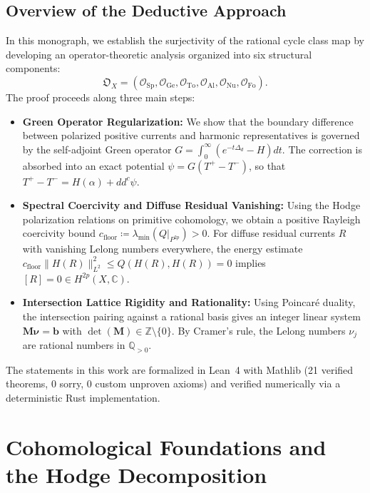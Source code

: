 \documentclass[11pt,a4paper]{article}
\theoremstyle{definition}
\theoremstyle{plain}
\begin{document}
\subsection*{Overview of the Deductive Approach}
In this monograph, we establish the surjectivity of the rational cycle class map by developing an operator-theoretic analysis organized into six structural components:
\begin{equation}
    \label{eq:master_object}
    \mathfrak{O}_X = \left( \mathcal{O}_{\mathrm{Sp}}, \mathcal{O}_{\mathrm{Ge}}, \mathcal{O}_{\mathrm{To}}, \mathcal{O}_{\mathrm{Al}}, \mathcal{O}_{\mathrm{Nu}}, \mathcal{O}_{\mathrm{Fo}} \right).
\end{equation}
The proof proceeds along three main steps:
\begin{itemize}[leftmargin=1.5em, itemsep=3pt]
    \item \textbf{Green Operator Regularization:} We show that the boundary difference between polarized positive currents and harmonic representatives is governed by the self-adjoint Green operator $G = \int_0^\infty (e^{-t\Delta_d} - H) dt$. The correction is absorbed into an exact potential $\psi = G(T^+ - T^-)$, so that $T^+ - T^- = H(\alpha) + dd^c \psi$.
    \item \textbf{Spectral Coercivity and Diffuse Residual Vanishing:} Using the Hodge polarization relations on primitive cohomology, we obtain a positive Rayleigh coercivity bound $c_{\mathrm{floor}} \coloneqq \lambda_{\min}(Q|_{P^{2p}}) > 0$. For diffuse residual currents $R$ with vanishing Lelong numbers everywhere, the energy estimate $c_{\mathrm{floor}} \|H(R)\|_{L^2}^2 \le Q(H(R), H(R)) = 0$ implies $[R] = 0 \in H^{2p}(X, \mathbb{C})$.
    \item \textbf{Intersection Lattice Rigidity and Rationality:} Using Poincaré duality, the intersection pairing against a rational basis gives an integer linear system $\mathbf{M} \boldsymbol{\nu} = \mathbf{b}$ with $\det(\mathbf{M}) \in \mathbb{Z} \setminus \{0\}$. By Cramer's rule, the Lelong numbers $\nu_j$ are rational numbers in $\mathbb{Q}_{>0}$.
\end{itemize}

The statements in this work are formalized in Lean~4 with Mathlib (21 verified theorems, 0 sorry, 0 custom unproven axioms) and verified numerically via a deterministic Rust implementation.

\section{Cohomological Foundations and the Hodge Decomposition}
\label{sec:postulate}
\end{document}

